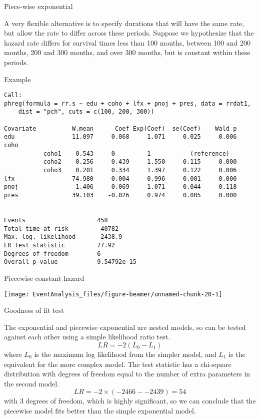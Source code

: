 \documentclass[10pt,ignorenonframetext,]{beamer}
\begin{document}
\begin{frame}{Piece-wise exponential}

A very flexible alternative is to specify durations that will have the
same rate, but allow the rate to differ across these periods. Suppose we
hypothesize that the hazard rate differs for survival times less than
100 months, between 100 and 200 months, 200 and 300 months, and over 300
months, but is constant within these periods.

\end{frame}

\begin{frame}[fragile]{Example}

\scriptsize

\begin{verbatim}
Call:
phreg(formula = rr.s ~ edu + coho + lfx + pnoj + pres, data = rrdat1, 
    dist = "pch", cuts = c(100, 200, 300))

Covariate          W.mean      Coef Exp(Coef)  se(Coef)    Wald p
edu                11.097     0.068     1.071     0.025     0.006 
coho 
           coho1    0.543     0         1           (reference)
           coho2    0.256     0.439     1.550     0.115     0.000 
           coho3    0.201     0.334     1.397     0.122     0.006 
lfx                74.980    -0.004     0.996     0.001     0.000 
pnoj                1.406     0.069     1.071     0.044     0.118 
pres               39.103    -0.026     0.974     0.005     0.000 


Events                    458 
Total time at risk         40782 
Max. log. likelihood      -2438.9 
LR test statistic         77.92 
Degrees of freedom        6 
Overall p-value           9.54792e-15
\end{verbatim}

\end{frame}

\begin{frame}{Piecewise constant hazard}

\begin{center}\texttt{[image: EventAnalysis\_files/figure-beamer/unnamed-chunk-20-1]} \end{center}

\end{frame}

\begin{frame}{Goodness of fit test}

The exponential and piecewise exponential are nested models, so can be
tested against each other using a simple likelihood ratio test. \[
LR = -2 (L_0 - L_1)
\] where \(L_0\) is the maximum log likelihood from the simpler model,
and \(L_1\) is the equivalent for the more complex model. The test
statistic has a chi-square distribution with degrees of freedom equal to
the number of extra parameters in the second model. \[
LR = -2 \times (-2466 - -2439) = 54
\] with 3 degrees of freedom, which is highly significant, so we can
conclude that the piecewise model fits better than the simple
exponential model.

\end{frame}
\end{document}
